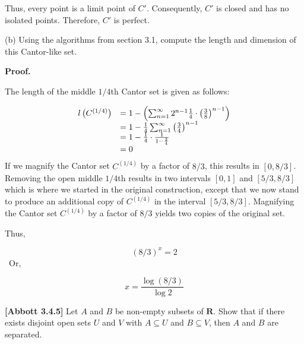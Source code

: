 \documentclass[10pt]{article}
\begin{document}
Thus, every point is a limit point of $\displaystyle C'$. Consequently, $\displaystyle C'$ is closed and has no isolated points. Therefore, $\displaystyle C'$ is perfect.



(b) Using the algorithms from section 3.1, compute the length and dimension of this Cantor-like set. 



\textbf{Proof.} 



The length of the middle $\displaystyle 1/4$th Cantor set is given as follows:


\begin{equation*}
\begin{array}{ c l }
l\left( C^{( 1/4)}\right) & =1-\left(\sum _{n=1}^{\infty } 2^{n-1}\frac{1}{4} \cdot \left(\frac{3}{8}\right)^{n-1}\right)\\
 & =1-\frac{1}{4}\sum _{n=1}^{\infty }\left(\frac{3}{4}\right)^{n-1}\\
 & =1-\frac{1}{4} \cdot \frac{1}{1-\frac{3}{4}}\\
 & =0
\end{array}
\end{equation*}
If we magnify the Cantor set $\displaystyle C^{( 1/4)}$ by a factor of $\displaystyle 8/3$, this results in $\displaystyle [ 0,8/3]$. Removing the open middle $\displaystyle 1/4$th results in two intervals $\displaystyle [ 0,1]$ and $\displaystyle [ 5/3,8/3]$ which is where we started in the original construction, except that we now stand to produce an additional copy of $\displaystyle C^{( 1/4)}$ in the interval $\displaystyle [ 5/3,8/3]$. Magnifying the Cantor set $\displaystyle C^{( 1/4)}$ by a factor of $\displaystyle 8/3$ yields two copies of the original set. 



Thus, 


\begin{equation*}
( 8/3)^{x} =2
\end{equation*}
 \ Or, 


\begin{equation*}
x=\frac{\log( 8/3)}{\log 2}
\end{equation*}


\textbf{[Abbott 3.4.5]} Let $\displaystyle A$ and $\displaystyle B$ be non-empty subsets of $\displaystyle \mathbf{R}$. Show that if there exists disjoint open sets $\displaystyle U$ and $\displaystyle V$ with $\displaystyle A\subseteq U$ and $\displaystyle B\subseteq V$, then $\displaystyle A$ and $\displaystyle B$ are separated.
\end{document}
